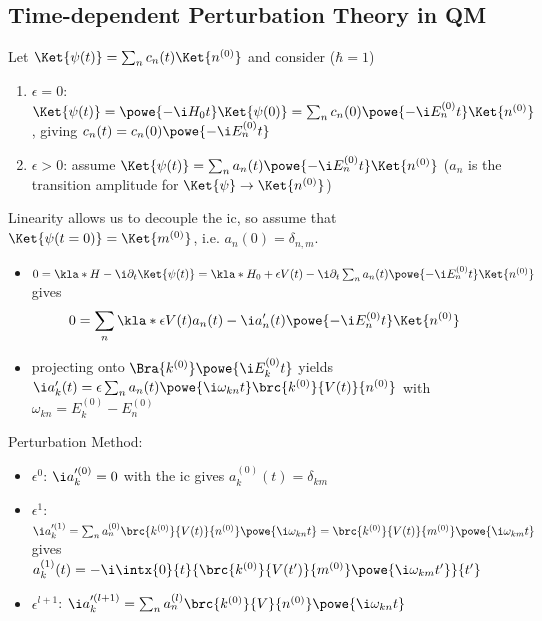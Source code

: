 \documentclass[english, parskip=full]{scrbook}
\newcommand{\definition}[2]{\begin{tcolorbox}[colback=colorbackgrounddefinition,colframe=colordefinition, breakable,enhanced,title=\textbf{#1}.]#2\end{tcolorbox}}
\begin{document}
\subsection{Time-dependent Perturbation Theory in QM}
\definition{$H=H_0+\epsilon V(t)$}{Let $\Ket{\psi(t)} = \sum_n c_n(t) \Ket{n^{(0)}}$ and consider ($\hbar=1$)
\begin{enumerate}
\item $\epsilon=0$: $\Ket{\psi(t)} = \powe{-\i H_0t} \Ket{\psi(0)} = \sum_n c_n(0) \powe{-\i E_n^{(0)}t} \Ket{n^{(0)}}$, giving $c_n(t) = c_n(0) \powe{-\i E_n^{(0)}t}$
\item $\epsilon > 0$: assume $\Ket{\psi(t)} = \sum_n a_n(t) \powe{-\i E_n^{(0)}t} \Ket{n^{(0)}}$ ($a_n$ is the transition amplitude for $\Ket{\psi} \rightarrow \Ket{n^{(0)}}$)
\end{enumerate}
Linearity allows us to decouple the \gls{ic}, so assume that $\Ket{\psi(t=0)} = \Ket{m^{(0)}}$, i.e. $a_n(0) = \delta_{n,m}$.
\begin{itemize}
\item $0 = \kla*{H - \i\partial_t}\Ket{\psi(t)} = \kla*{H_0+\epsilon V(t) - \i\partial_t} \sum_n a_n(t) \powe{-\i E_n^{(0)} t} \Ket{n^{(0)}}$ gives \begin{align}
0 &= \sum_n \kla*{\epsilon V(t) a_n(t) - \i a_n'(t)} \powe{-\i E_n^{(0)} t} \Ket{n^{(0)}}
\end{align}
\item projecting onto $\Bra{k^{(0)}} \powe{\i E_k^{(0)} t}$ yields $\i a_k'(t) = \epsilon \sum_n a_n(t) \powe{\i \omega_{kn} t} \brc{k^{(0)}}{V(t)}{n^{(0)}}$ with $\omega_{kn} = E_k^{(0)} - E_n^{(0)}$
\end{itemize}
Perturbation Method:
\begin{itemize}
\item $\epsilon^0$: $\i a_k'^{(0)}=0$ with the \gls{ic} gives $a_k^{(0)}(t) = \delta_{km}$
\item $\epsilon^1$: $\i a_k'^{(1)} = \sum_n a_n^{(0)} \brc{k^{(0)}}{V(t)}{n^{(0)}} \powe{\i \omega_{kn}t} = \brc{k^{(0)}}{V(t)}{m^{(0)}} \powe{\i\omega_{km} t}$ gives $a_k^{(1)}(t) = -\i \intx{0}{t}{\brc{k^{(0)}}{V(t')}{m^{(0)}} \powe{\i\omega_{km} t'}}{t'}$
\item $\epsilon^{l+1}$: $\i a_k'^{(l+1)} = \sum_n a_n^{(l)} \brc{k^{(0)}}{V}{n^{(0)}} \powe{\i\omega_{kn} t}$
\end{itemize}
}
\end{document}
